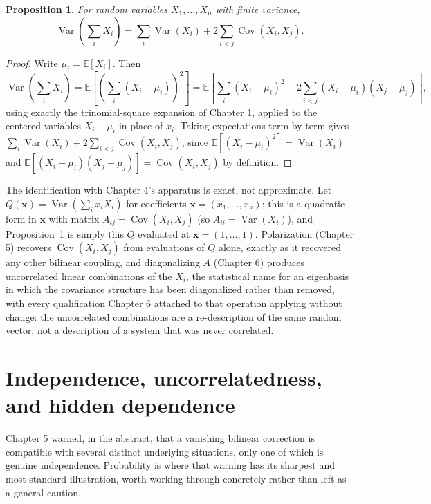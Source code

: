 \documentclass[11pt]{book}
\newtheorem{proposition}[theorem]{Proposition}
\begin{document}
\begin{proposition}
\label{prop:variance-sum}
For random variables $X_1,\ldots,X_n$ with finite variance,
\[
\operatorname{Var}\!\left(\sum_i X_i\right) = \sum_i \operatorname{Var}(X_i) + 2\sum_{i<j}\operatorname{Cov}(X_i,X_j).
\]
\end{proposition}
\begin{proof}
Write $\mu_i=\mathbb E[X_i]$. Then
\[
\operatorname{Var}\!\left(\sum_i X_i\right) = \mathbb E\!\left[\left(\sum_i(X_i-\mu_i)\right)^{\!2}\right] = \mathbb E\!\left[\sum_i(X_i-\mu_i)^2 + 2\sum_{i<j}(X_i-\mu_i)(X_j-\mu_j)\right],
\]
using exactly the trinomial-square expansion of Chapter 1, applied to the centered variables $X_i-\mu_i$ in place of $x_i$. Taking expectations term by term gives $\sum_i\operatorname{Var}(X_i) + 2\sum_{i<j}\operatorname{Cov}(X_i,X_j)$, since $\mathbb E[(X_i-\mu_i)^2]=\operatorname{Var}(X_i)$ and $\mathbb E[(X_i-\mu_i)(X_j-\mu_j)]=\operatorname{Cov}(X_i,X_j)$ by definition.
\end{proof}

The identification with Chapter 4's apparatus is exact, not approximate. Let $Q(\mathbf{x})=\operatorname{Var}(\sum_i x_iX_i)$ for coefficients $\mathbf{x}=(x_1,\ldots,x_n)$; this is a quadratic form in $\mathbf{x}$ with matrix $A_{ij}=\operatorname{Cov}(X_i,X_j)$ (so $A_{ii}=\operatorname{Var}(X_i)$), and Proposition~\ref{prop:variance-sum} is simply this $Q$ evaluated at $\mathbf{x}=(1,\ldots,1)$. Polarization (Chapter 5) recovers $\operatorname{Cov}(X_i,X_j)$ from evaluations of $Q$ alone, exactly as it recovered any other bilinear coupling, and diagonalizing $A$ (Chapter 6) produces uncorrelated linear combinations of the $X_i$, the statistical name for an eigenbasis in which the covariance structure has been diagonalized rather than removed, with every qualification Chapter 6 attached to that operation applying without change: the uncorrelated combinations are a re-description of the same random vector, not a description of a system that was never correlated.

\section{Independence, uncorrelatedness, and hidden dependence}

Chapter 5 warned, in the abstract, that a vanishing bilinear correction is compatible with several distinct underlying situations, only one of which is genuine independence. Probability is where that warning has its sharpest and most standard illustration, worth working through concretely rather than left as a general caution.
\end{document}
